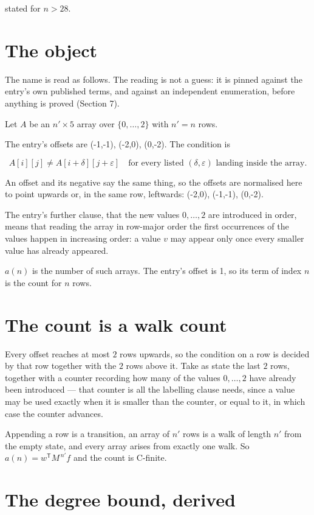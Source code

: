 \documentclass[11pt]{article}
\theoremstyle{definition}
\begin{document}
stated for $n > 28$.

\section{The object}

The name is read as follows. The reading is not a guess: it is pinned against the entry's own published terms, and against an independent enumeration, before anything is proved (Section 7).

Let $A$ be an $n' \times 5$ array over $\{0,\dots,2\}$ with $n' = n$ rows.

The entry's offsets are (-1,-1), (-2,0), (0,-2). The condition is

\[A[i][j] \ne A[i{+}\delta][j{+}\varepsilon]\quad\text{for every listed }(\delta,\varepsilon)\text{ landing inside the array.}\]

An offset and its negative say the same thing, so the offsets are normalised here to point upwards or, in the same row, leftwards: (-2,0), (-1,-1), (0,-2).

The entry's further clause, that the new values $0,\dots,2$ are introduced in order, means that reading the array in row-major order the first occurrences of the values happen in increasing order: a value $v$ may appear only once every smaller value has already appeared.

$a(n)$ is the number of such arrays. The entry's offset is 1, so its term of index $n$ is the count for $n$ rows.

\section{The count is a walk count}

Every offset reaches at most $2$ rows upwards, so the condition on a row is decided by that row together with the $2$ rows above it. Take as state the last $2$ rows, together with a counter recording how many of the values $0,\dots,2$ have already been introduced --- that counter is all the labelling clause needs, since a value may be used exactly when it is smaller than the counter, or equal to it, in which case the counter advances.

Appending a row is a transition, an array of $n'$ rows is a walk of length $n'$ from the empty state, and every array arises from exactly one walk. So $a(n) = w^{\mathsf T}M^{\,n'}f$ and the count is C-finite.

\section{The degree bound, derived}
\end{document}
